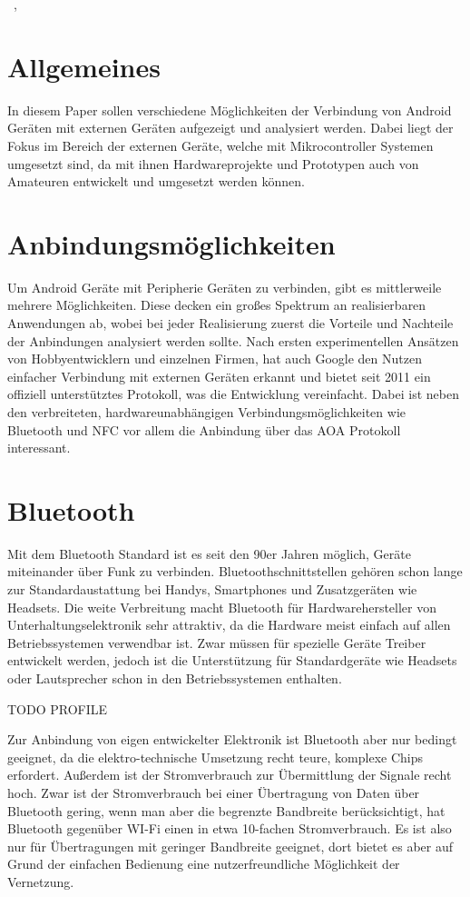 \documentclass[12pt,journal,compsoc]{IEEEtran}
\begin{document}
\hfill{\the\day~\Monat, \the\year  }

\section{Allgemeines}
In diesem Paper sollen verschiedene Möglichkeiten der Verbindung von Android Geräten mit externen Geräten aufgezeigt und analysiert werden.
Dabei liegt der Fokus im Bereich der externen Geräte, welche mit Mikrocontroller Systemen umgesetzt sind, da mit ihnen Hardwareprojekte und Prototypen auch von Amateuren entwickelt und umgesetzt werden können.

\section{Anbindungsmöglichkeiten}
Um Android Geräte mit Peripherie Geräten zu verbinden, gibt es mittlerweile mehrere Möglichkeiten.
Diese decken ein großes Spektrum an realisierbaren Anwendungen ab, wobei bei jeder Realisierung zuerst die Vorteile und Nachteile der Anbindungen analysiert werden sollte.
Nach ersten experimentellen Ansätzen von Hobbyentwicklern und einzelnen Firmen, hat auch Google den Nutzen einfacher Verbindung mit externen Geräten 
erkannt und bietet seit 2011 ein offiziell unterstütztes Protokoll, was die Entwicklung vereinfacht.
Dabei ist neben den verbreiteten, hardwareunabhängigen Verbindungsmöglichkeiten wie Bluetooth und NFC vor allem die Anbindung über das AOA Protokoll interessant. 

\section{Bluetooth}
Mit dem Bluetooth Standard ist es seit den 90er Jahren möglich, Geräte miteinander über Funk zu verbinden. Bluetoothschnittstellen gehören schon lange zur Standardaustattung bei Handys, Smartphones und Zusatzgeräten wie Headsets.
Die weite Verbreitung macht Bluetooth für Hardwarehersteller von Unterhaltungselektronik sehr attraktiv, da die Hardware meist einfach auf allen Betriebssystemen verwendbar ist.
Zwar müssen für spezielle Geräte Treiber entwickelt werden, jedoch ist die Unterstützung für Standardgeräte wie Headsets oder Lautsprecher schon in den Betriebssystemen enthalten.

TODO PROFILE
\cite{bluetooth}

Zur Anbindung von eigen entwickelter Elektronik ist Bluetooth aber nur bedingt geeignet, da die elektro-technische Umsetzung recht teure, komplexe Chips erfordert. Außerdem ist der Stromverbrauch zur Übermittlung der Signale recht hoch.
Zwar ist der Stromverbrauch bei einer Übertragung von Daten über Bluetooth gering, wenn man aber die begrenzte Bandbreite berücksichtigt, hat Bluetooth gegenüber WI-Fi einen in etwa 10-fachen Stromverbrauch.\cite{wireless}
Es ist also nur für Übertragungen mit geringer Bandbreite geeignet, dort bietet es aber auf Grund der einfachen Bedienung eine nutzerfreundliche Möglichkeit der Vernetzung.
\end{document}
